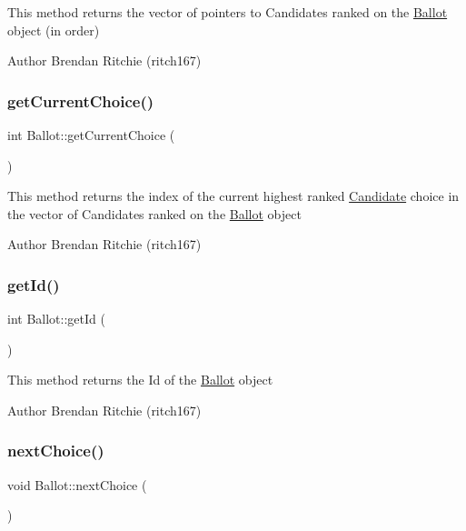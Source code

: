 This method returns the vector of pointers to Candidates ranked on the \hyperlink{classBallot}{Ballot} object (in order) \begin{DoxyAuthor}{Author}
Brendan Ritchie (ritch167) 
\end{DoxyAuthor}
\mbox{\label{classBallot_ae76fc12248878a72a1817adc9fc8361c}} 
\subsubsection{\texorpdfstring{get\+Current\+Choice()}{getCurrentChoice()}}
{\footnotesize\ttfamily int Ballot\+::get\+Current\+Choice (\begin{DoxyParamCaption}{ }\end{DoxyParamCaption})}

This method returns the index of the current highest ranked \hyperlink{classCandidate}{Candidate} choice in the vector of Candidates ranked on the \hyperlink{classBallot}{Ballot} object \begin{DoxyAuthor}{Author}
Brendan Ritchie (ritch167) 
\end{DoxyAuthor}
\mbox{\label{classBallot_a1ff11d3400230f4837fdec904d7e66fd}} 
\subsubsection{\texorpdfstring{get\+Id()}{getId()}}
{\footnotesize\ttfamily int Ballot\+::get\+Id (\begin{DoxyParamCaption}{ }\end{DoxyParamCaption})}

This method returns the Id of the \hyperlink{classBallot}{Ballot} object \begin{DoxyAuthor}{Author}
Brendan Ritchie (ritch167) 
\end{DoxyAuthor}
\mbox{\label{classBallot_a1704d1d5b16cc9d3a8e5a2c64c933311}} 
\subsubsection{\texorpdfstring{next\+Choice()}{nextChoice()}}
{\footnotesize\ttfamily void Ballot\+::next\+Choice (\begin{DoxyParamCaption}{ }\end{DoxyParamCaption})}

